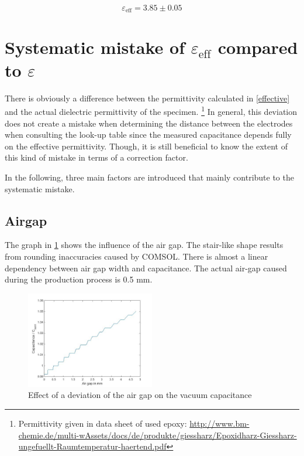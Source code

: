 \begin{equation}
 \varepsilon_{\textrm{eff}}=3.85 \pm 0.05
\end{equation}



\section{Systematic mistake of $\varepsilon_{\textrm{eff}}$ compared to $\varepsilon$}
There is obviously a difference between the permittivity calculated in \ref{effective}
and the actual dielectric permittivity of the specimen. \footnote{Permittivity given in data sheet of used epoxy: \url{http://www.bm-chemie.de/multi-wAssets/docs/de/produkte/giessharz/Epoxidharz-Giessharz-ungefuellt-Raumtemperatur-haertend.pdf}}
In general, this deviation does not create a mistake when determining the
distance between the electrodes when consulting the look-up table since the
measured capacitance depends fully on the effective permittivity. Though, it is still
beneficial to know the extent of this kind of mistake in terms of a correction factor.

In the following, three main factors are introduced that mainly contribute to the systematic mistake.

\subsection{Airgap}
The graph in \ref{fig.airgap} shows the influence of the air gap. The stair-like shape results from rounding inaccuracies caused by COMSOL. There is almost a linear dependency between air gap width and capacitance. The actual air-gap caused during the production process is 0.5 mm. 

\begin{figure}[h!tb]
	\centering
	\includegraphics[width=0.5\textwidth]{figures/Results/airgap_height/airgap_graph.jpg}		
	\caption[Kurze Abbildungsbeschreibung]{Effect of a deviation of the air gap on the vacuum capacitance}
	\label{fig.airgap}
\end{figure}
 
